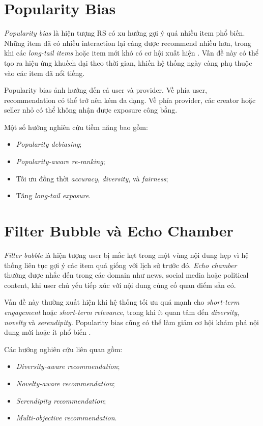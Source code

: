 \documentclass[12pt,a4paper]{article}
\begin{document}
\section{Popularity Bias}

\textit{Popularity bias} là hiện tượng RS có xu hướng gợi ý quá nhiều item phổ biến. 
Những item đã có nhiều interaction lại càng được recommend nhiều hơn, trong khi các \textit{long-tail items} hoặc item mới khó có cơ hội xuất hiện \cite{klimashevskaia2024popularity}. 
Vấn đề này có thể tạo ra hiệu ứng khuếch đại theo thời gian, khiến hệ thống ngày càng phụ thuộc vào các item đã nổi tiếng.

Popularity bias ảnh hưởng đến cả user và provider. 
Về phía user, recommendation có thể trở nên kém đa dạng. 
Về phía provider, các creator hoặc seller nhỏ có thể không nhận được exposure công bằng.

Một số hướng nghiên cứu tiềm năng bao gồm:

\begin{itemize}[leftmargin=*]
    \item \textit{Popularity debiasing};
    \item \textit{Popularity-aware re-ranking};
    \item Tối ưu đồng thời \textit{accuracy}, \textit{diversity}, và \textit{fairness};
    \item Tăng \textit{long-tail exposure}.
\end{itemize}

\section{Filter Bubble và Echo Chamber}

\textit{Filter bubble} là hiện tượng user bị mắc kẹt trong một vùng nội dung hẹp vì hệ thống liên tục gợi ý các item quá giống với lịch sử trước đó. 
\textit{Echo chamber} thường được nhắc đến trong các domain như news, social media hoặc political content, khi user chủ yếu tiếp xúc với nội dung củng cố quan điểm sẵn có.

Vấn đề này thường xuất hiện khi hệ thống tối ưu quá mạnh cho \textit{short-term engagement} hoặc \textit{short-term relevance}, trong khi ít quan tâm đến \textit{diversity}, \textit{novelty} và \textit{serendipity}. 
Popularity bias cũng có thể làm giảm cơ hội khám phá nội dung mới hoặc ít phổ biến \cite{klimashevskaia2024popularity}.

Các hướng nghiên cứu liên quan gồm:

\begin{itemize}[leftmargin=*]
    \item \textit{Diversity-aware recommendation};
    \item \textit{Novelty-aware recommendation};
    \item \textit{Serendipity recommendation};
    \item \textit{Multi-objective recommendation}.
\end{itemize}
\end{document}
